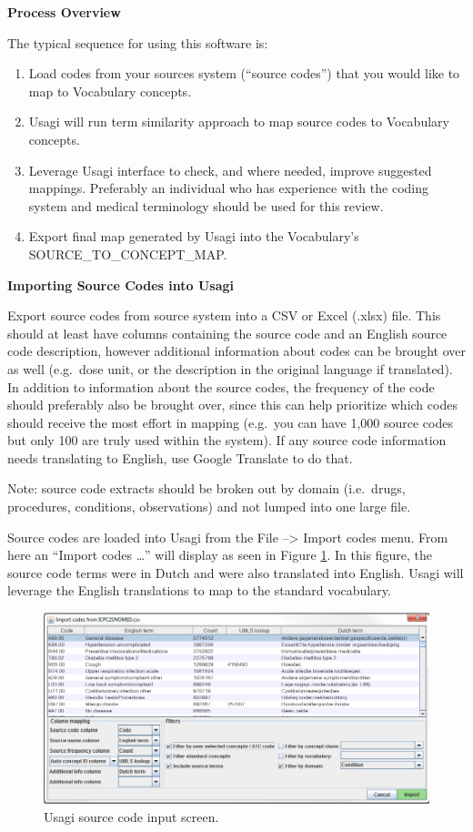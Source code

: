 \documentclass[11pt]{book}
\providecommand{\tightlist}{%
  \setlength{\itemsep}{0pt}\setlength{\parskip}{0pt}}
\theoremstyle{definition}
\theoremstyle{definition}
\theoremstyle{definition}
\theoremstyle{remark}
\begin{document}
\textbf{Process Overview}

The typical sequence for using this software is:

\begin{enumerate}
\def\labelenumi{\arabic{enumi}.}
\tightlist
\item
  Load codes from your sources system (``source codes'') that you would like to map to Vocabulary concepts.
\item
  Usagi will run term similarity approach to map source codes to Vocabulary concepts.
\item
  Leverage Usagi interface to check, and where needed, improve suggested mappings. Preferably an individual who has experience with the coding system and medical terminology should be used for this review.
\item
  Export final map generated by Usagi into the Vocabulary's SOURCE\_TO\_CONCEPT\_MAP.
\end{enumerate}

\textbf{Importing Source Codes into Usagi}

Export source codes from source system into a CSV or Excel (.xlsx) file. This should at least have columns containing the source code and an English source code description, however additional information about codes can be brought over as well (e.g.~dose unit, or the description in the original language if translated). In addition to information about the source codes, the frequency of the code should preferably also be brought over, since this can help prioritize which codes should receive the most effort in mapping (e.g.~you can have 1,000 source codes but only 100 are truly used within the system). If any source code information needs translating to English, use Google Translate to do that.

Note: source code extracts should be broken out by domain (i.e.~drugs, procedures, conditions, observations) and not lumped into one large file.

Source codes are loaded into Usagi from the File --\textgreater{} Import codes menu. From here an ``Import codes \ldots{}'' will display as seen in Figure \ref{fig:usagiImport}. In this figure, the source code terms were in Dutch and were also translated into English. Usagi will leverage the English translations to map to the standard vocabulary.

\begin{figure}
\includegraphics[width=1\linewidth]{images/ExtractTransformLoad/usagiImport} \caption{Usagi source code input screen.}\label{fig:usagiImport}
\end{figure}
\end{document}
